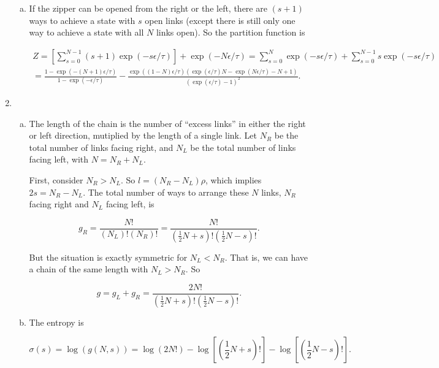 \documentclass{article}
\begin{document}
\begin{enumerate}
\begin{enumerate}[(a)]
		\item

		If the zipper can be opened from the right or the left, there are $(s+1)$ ways to achieve a state with $s$ open links (except there is still only one way to achieve a state with all $N$ links open). So the partition function is

		\begin{multline*}
		Z = \left[ \sum \limits_{s=0}^{N-1} (s+1) \exp(-s\epsilon/\tau) \right] + \exp(-N\epsilon/\tau) = \sum \limits_{s=0}^{N} \exp(-s\epsilon/\tau) + \sum \limits_{s=0}^{N-1} s \exp(-s\epsilon/\tau) \\
		= \frac{1 - \exp(-(N+1)\epsilon/\tau)}{1 - \exp(-\epsilon/\tau)} - \frac{\exp((1-N) \epsilon/\tau) (\exp(\epsilon/\tau)N - \exp(N\epsilon/\tau) - N +1 )}{(\exp(\epsilon/\tau) - 1)^2}.
		\end{multline*}

	\end{enumerate}

	\item 

	\begin{enumerate}[(a)]

		\item

		The length of the chain is the number of ``excess links'' in either the right or left direction, mutiplied by the length of a single link. Let $N_R$ be the total number of links facing right, and $N_L$ be the total number of links facing left, with $N = N_R + N_L$.

		First, consider $N_R > N_L$. So $l = (N_R - N_L) \rho$, which implies $2s = N_R - N_L$. The total number of ways to arrange these $N$ links, $N_R$ facing right and $N_L$ facing left, is

		$$g_R = \frac{N!}{(N_L)!(N_R)!} = \frac{N!}{(\frac{1}{2}N + s)!(\frac{1}{2}N - s)!}.$$

		But the situation is exactly symmetric for $N_L < N_R$. That is, we can have a chain of the same length with $N_L > N_R$. So

		$$g = g_L + g_R = \frac{2N!}{(\frac{1}{2}N + s)!(\frac{1}{2}N - s)!}.$$

		\item

		The entropy is

		$$
		\sigma(s) = \log(g(N, s)) = \log(2N!) - \log \left[\left(\frac{1}{2}N + s \right)! \right] - \log \left[\left(\frac{1}{2}N - s \right)! \right].$$


\end{enumerate}
\end{enumerate}
\end{document}

